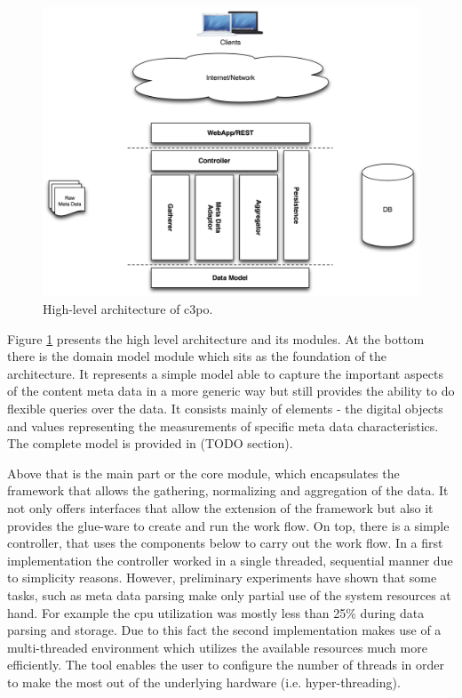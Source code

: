 \begin{figure}[htb]
\begin{center}
\includegraphics[width=5.5in]{figures/architecture/c3po_highlevel_architecture.png}
\caption{High-level architecture of c3po.}
\label{fig:architecture_highlevel}
\end{center}
\end{figure}

Figure \ref{fig:architecture_highlevel} presents the high level architecture and its modules. At the bottom there is the domain model module which sits as the foundation of the architecture. It represents a simple model able to capture the important aspects of the content meta data in a more generic way but still provides the ability to do flexible queries over the data. It consists mainly of elements - the digital objects and values representing the measurements of specific meta data characteristics. The complete model is provided in (TODO section).

Above that is the main part or the core module, which encapsulates the framework that allows the gathering, normalizing and aggregation of the data. It not only offers interfaces that allow the extension of the framework but also it provides the glue-ware to create and run the work flow.
On top, there is a simple controller, that uses the components below to carry out the work flow. In a first implementation the controller worked in a single threaded, sequential manner due to simplicity reasons. However, preliminary experiments have shown that some tasks, such as meta data parsing make only partial use of the system resources at hand. For example the cpu utilization was mostly less than 25\% during data parsing and storage. Due to this fact the second implementation makes use of a multi-threaded environment which utilizes the available resources much more efficiently. The tool enables the user to configure the number of threads in order to make the most out of the underlying hardware (i.e. hyper-threading).

